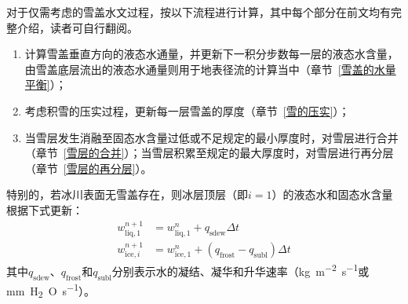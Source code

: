 对于仅需考虑的雪盖水文过程，按以下流程进行计算，其中每个部分在前文均有完整介绍，读者可自行翻阅。
\begin{enumerate}
  \item 计算雪盖垂直方向的液态水通量，并更新下一积分步数每一层的液态水含量，由雪盖底层流出的液态水通量则用于地表径流的计算当中（章节~\ref{雪盖的水量平衡}）；
  \item 考虑积雪的压实过程，更新每一层雪盖的厚度（章节~\ref{雪的压实}）；
  \item 当雪层发生消融至固态水含量过低或不足规定的最小厚度时，对雪层进行合并（章节~\ref{雪层的合并}）；当雪层积累至规定的最大厚度时，对雪层进行再分层（章节~\ref{雪层的再分层}）。
\end{enumerate}

特别的，若冰川表面无雪盖存在，则冰层顶层（即$i=1$）的液态水和固态水含量根据下式更新：
\begin{equation}
  \begin{aligned}
    w^{n+1}_{\mathrm{liq,1}} &= w^{n}_{\mathrm{liq,1}} + q_{\mathrm{sdew}} \Delta t \\
    w^{n+1}_{\mathrm{ice},i} &= w^{n}_{\mathrm{ice,1}} + \left(q_{\mathrm{frost}}-q_{\mathrm{subl}}\right) \Delta t
  \end{aligned}
\end{equation}
其中$q_{\mathrm{sdew}}$、$q_{\mathrm{frost}}$和$q_{\mathrm{subl}}$分别表示水的凝结、凝华和升华速率（\unit{kg.m^{-2}.s^{-1}}或\unit{mm.H_2O.s^{-1}}）。
